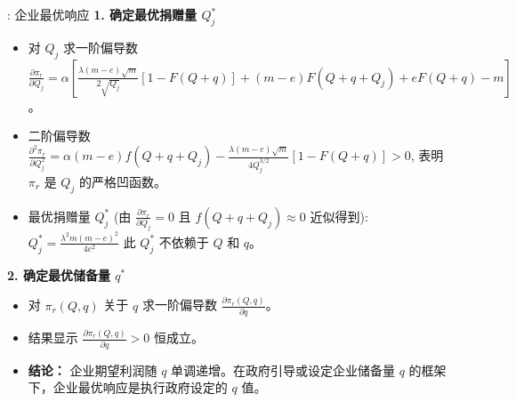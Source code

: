 \documentclass[9pt]{beamer}
\begin{document}
\begin{frame}{\insertsectionhead: 企业最优响应}
    \textbf{1. 确定最优捐赠量 $Q_j^*$}
    \begin{itemize}
        \item 对 $Q_j$ 求一阶偏导数 $\frac{\partial{\pi}_r}{\partial Q_j} =\alpha[ \frac{\lambda(m-e)\sqrt{m}}{2\sqrt{Q_j}} [1 - F(Q+q)] + (m-e) F(Q+q+Q_j) + e F(Q+q) - m ]$。
        \item 二阶偏导数 $\frac{\partial^2 {\pi}_r}{\partial Q_j^2}= \alpha  (m-e) f(Q+q+Q_j)- \frac{\lambda(m-e)\sqrt{m}}{4 Q_j^{3/2}} [1 - F(Q+q)] > 0 $, 表明 $\pi_r$ 是 $Q_j$ 的严格凹函数。
        \item 最优捐赠量 $Q_j^*$ (由 $\frac{\partial{\pi}_r}{\partial Q_j}=0$ 且 $f(Q+q+Q_j) \approx 0$ 近似得到):\\
        $Q_j^* = \frac{\lambda^2 m (m-e)^2}{4e^2}$
        此 $Q_j^*$ 不依赖于 $Q$ 和 $q$。
    \end{itemize}
    \vspace{0.5em}
    \textbf{2. 确定最优储备量 $q^*$}
    \begin{itemize}
        \item 对 $\pi_r(Q,q)$ 关于 $q$ 求一阶偏导数 $\frac{\partial \pi_r(Q,q)}{\partial q}$。
        \item 结果显示 $\frac{\partial \pi_r(Q,q)}{\partial q} > 0$ 恒成立。
        \item \textbf{结论：} 企业期望利润随 $q$ 单调递增。在政府引导或设定企业储备量 $q$ 的框架下，企业最优响应是执行政府设定的 $q$ 值。
    \end{itemize}
\end{frame}
\end{document}

